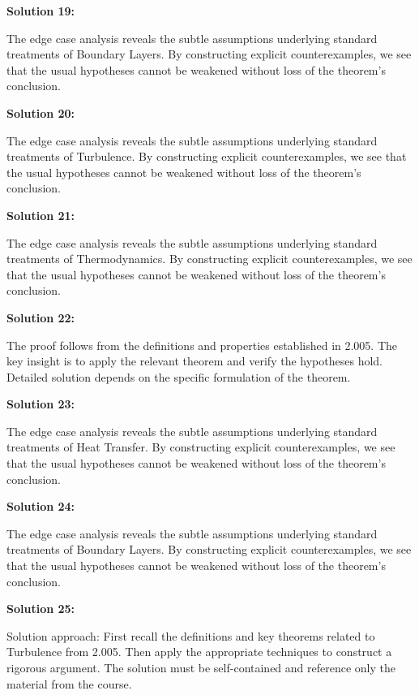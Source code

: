 \documentclass[12pt,a4paper]{exam}
\begin{document}
\vspace{0.5cm}

\textbf{Solution 19:}

The edge case analysis reveals the subtle assumptions underlying standard treatments of Boundary Layers. By constructing explicit counterexamples, we see that the usual hypotheses cannot be weakened without loss of the theorem's conclusion.

\vspace{0.5cm}

\textbf{Solution 20:}

The edge case analysis reveals the subtle assumptions underlying standard treatments of Turbulence. By constructing explicit counterexamples, we see that the usual hypotheses cannot be weakened without loss of the theorem's conclusion.

\vspace{0.5cm}

\textbf{Solution 21:}

The edge case analysis reveals the subtle assumptions underlying standard treatments of Thermodynamics. By constructing explicit counterexamples, we see that the usual hypotheses cannot be weakened without loss of the theorem's conclusion.

\vspace{0.5cm}

\textbf{Solution 22:}

The proof follows from the definitions and properties established in 2.005. The key insight is to apply the relevant theorem and verify the hypotheses hold. Detailed solution depends on the specific formulation of the theorem.

\vspace{0.5cm}

\textbf{Solution 23:}

The edge case analysis reveals the subtle assumptions underlying standard treatments of Heat Transfer. By constructing explicit counterexamples, we see that the usual hypotheses cannot be weakened without loss of the theorem's conclusion.

\vspace{0.5cm}

\textbf{Solution 24:}

The edge case analysis reveals the subtle assumptions underlying standard treatments of Boundary Layers. By constructing explicit counterexamples, we see that the usual hypotheses cannot be weakened without loss of the theorem's conclusion.

\vspace{0.5cm}

\textbf{Solution 25:}

Solution approach: First recall the definitions and key theorems related to Turbulence from 2.005. Then apply the appropriate techniques to construct a rigorous argument. The solution must be self-contained and reference only the material from the course.

\vspace{0.5cm}
\end{document}
